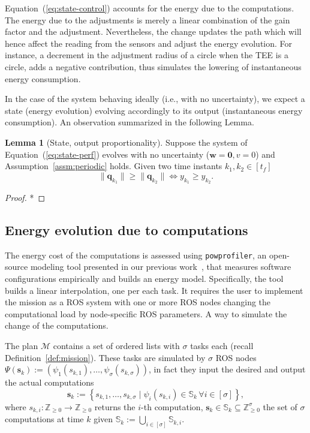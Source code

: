 \documentclass[letterpaper,10pt,conference]{ieeeconf}
\newcommand{\stt}[1]{{\small\tt #1}} %
\newcommand{\powprof}{\stt{powprofiler}}
\theoremstyle{definition}
\newtheorem{lem}[thm]{Lemma}
\begin{document}
Equation~(\ref{eq:state-control}) accounts for the energy due to the computations. The energy due to the adjustments is merely a linear combination of the gain factor and the adjustment. Nevertheless, the change updates the path which will hence affect the reading from the sensors and adjust the energy evolution. For instance, a decrement in the adjustment radius of a circle when the TEE is a circle, adds a negative contribution, thus simulates the lowering of instantaneous energy consumption.

In the case of the system behaving ideally (i.e., with no uncertainty), we expect a state (energy evolution) evolving accordingly to its output (instantaneous energy consumption). An observation summarized in the following Lemma.

\begin{lem}[State, output proportionality]\label{lem:state-vs-energy}
  Suppose the system of Equation~(\ref{eq:state-perf}) evolves with no uncertainty ($\mathbf{w}=\mathbf{0},v=0$) and Assumption~\ref{assm:periodic} holds. Given two time instants $k_1,k_2\in[t_f]$
  \begin{equation}
    \|\mathbf{q}_{k_1}\|\geq\|\mathbf{q}_{k_2}\|\iff y_{k_1}\geq y_{k_2}.
  \end{equation}
\end{lem}
\begin{proof}
  *
\end{proof}

\subsection{Energy evolution due to computations}
\label{sec:computations-model}

The energy cost of the computations is assessed using \powprof{}, an open-source modeling tool presented in our previous work~\cite{seewald2019coarse}, that measures software configurations empirically and builds an energy model. Specifically, the tool builds a linear interpolation, one per each task. It requires the user to implement the mission as a ROS system with one or more ROS nodes changing the computational load by node-specific ROS parameters. A way to simulate the change of the computations.

The plan $\mathcal{M}$ contains a set of ordered lists with $\sigma$ tasks each (recall Definition~\ref{def:mission}). These tasks are simulated by $\sigma$ ROS nodes $\Psi(\mathbf{s}_k):=\left(\psi_1(s_{k,1}),\dots,\psi_\sigma(s_{k,\sigma})\right)$, in fact they input the desired and output the actual computations
\begin{equation}\label{eq:qos-def}
  \mathbf{s}_k:=\left\{s_{k,1},\dots ,s_{k,\sigma}\mid \psi_i(s_{k,i})\in\mathbb{S}_{k}\,\forall i\in[\sigma]\right\},
\end{equation}
where $s_{k,i}:\mathbb{Z}_{\geq 0}\rightarrow\mathbb{Z}_{\geq 0}$ returns the $i$-th computation, $\mathbf{s}_k\in\mathbb{S}_k\subseteq\mathbb{Z}_{\geq 0}^\sigma$ the set of $\sigma$ computations at time $k$ given $\mathbb{S}_k:=\bigcup_{i\in[\sigma]}{\mathbb{S}_{k,i}}$.
\end{document}
